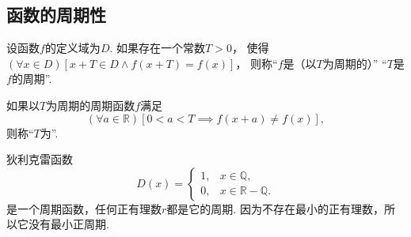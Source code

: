 \subsection{函数的周期性}
\begin{definition}
设函数\(f\)的定义域为\(D\).
如果存在一个常数\(T>0\)，
使得\((\forall x \in D)
[x+T \in D \land f(x+T) = f(x)]\)，
则称“\(f\)是（以\(T\)为周期的）”
“\(T\)是\(f\)的周期”.

如果以\(T\)为周期的周期函数\(f\)满足\[
	(\forall a\in\mathbb{R})
	[0<a<T \implies f(x+a) \neq f(x)],
\]
则称“\(T\)为”.
\end{definition}

\begin{example}
狄利克雷函数\[
	D(x) = \left\{ \begin{array}{ll}
		1, & x \in \mathbb{Q}, \\
		0, & x \in \mathbb{R}-\mathbb{Q}.
	\end{array} \right.
\]是一个周期函数，任何正有理数\(r\)都是它的周期.
因为不存在最小的正有理数，所以它没有最小正周期.
\end{example}
